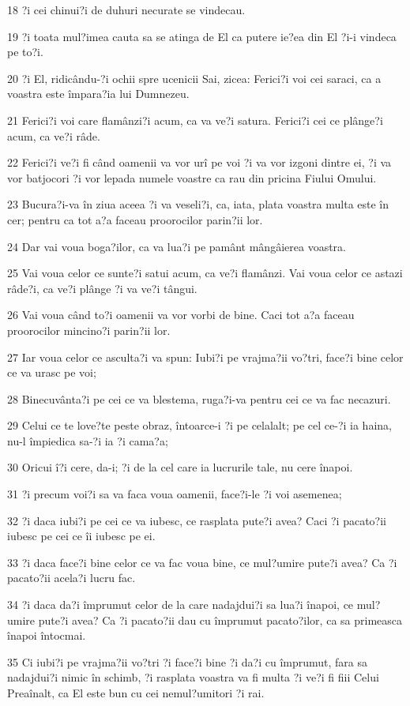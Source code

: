 \par 18 ?i cei chinui?i de duhuri necurate se vindecau.
\par 19 ?i toata mul?imea cauta sa se atinga de El ca putere ie?ea din El ?i-i vindeca pe to?i.
\par 20 ?i El, ridicându-?i ochii spre ucenicii Sai, zicea: Ferici?i voi cei saraci, ca a voastra este împara?ia lui Dumnezeu.
\par 21 Ferici?i voi care flamânzi?i acum, ca va ve?i satura. Ferici?i cei ce plânge?i acum, ca ve?i râde.
\par 22 Ferici?i ve?i fi când oamenii va vor urî pe voi ?i va vor izgoni dintre ei, ?i va vor batjocori ?i vor lepada numele voastre ca rau din pricina Fiului Omului.
\par 23 Bucura?i-va în ziua aceea ?i va veseli?i, ca, iata, plata voastra multa este în cer; pentru ca tot a?a faceau proorocilor parin?ii lor.
\par 24 Dar vai voua boga?ilor, ca va lua?i pe pamânt mângâierea voastra.
\par 25 Vai voua celor ce sunte?i satui acum, ca ve?i flamânzi. Vai voua celor ce astazi râde?i, ca ve?i plânge ?i va ve?i tângui.
\par 26 Vai voua când to?i oamenii va vor vorbi de bine. Caci tot a?a faceau proorocilor mincino?i parin?ii lor.
\par 27 Iar voua celor ce asculta?i va spun: Iubi?i pe vrajma?ii vo?tri, face?i bine celor ce va urasc pe voi;
\par 28 Binecuvânta?i pe cei ce va blestema, ruga?i-va pentru cei ce va fac necazuri.
\par 29 Celui ce te love?te peste obraz, întoarce-i ?i pe celalalt; pe cel ce-?i ia haina, nu-l împiedica sa-?i ia ?i cama?a;
\par 30 Oricui î?i cere, da-i; ?i de la cel care ia lucrurile tale, nu cere înapoi.
\par 31 ?i precum voi?i sa va faca voua oamenii, face?i-le ?i voi asemenea;
\par 32 ?i daca iubi?i pe cei ce va iubesc, ce rasplata pute?i avea? Caci ?i pacato?ii iubesc pe cei ce îi iubesc pe ei.
\par 33 ?i daca face?i bine celor ce va fac voua bine, ce mul?umire pute?i avea? Ca ?i pacato?ii acela?i lucru fac.
\par 34 ?i daca da?i împrumut celor de la care nadajdui?i sa lua?i înapoi, ce mul?umire pute?i avea? Ca ?i pacato?ii dau cu împrumut pacato?ilor, ca sa primeasca înapoi întocmai.
\par 35 Ci iubi?i pe vrajma?ii vo?tri ?i face?i bine ?i da?i cu împrumut, fara sa nadajdui?i nimic în schimb, ?i rasplata voastra va fi multa ?i ve?i fi fiii Celui Preaînalt, ca El este bun cu cei nemul?umitori ?i rai.
